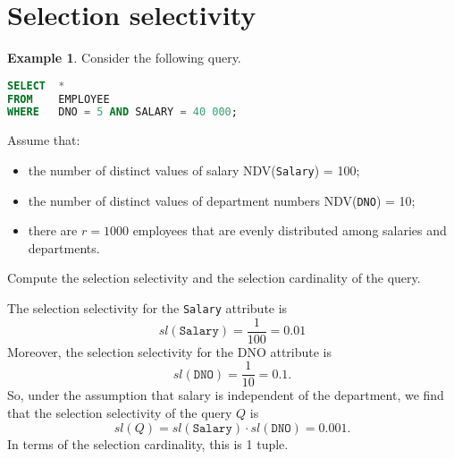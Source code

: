 \documentclass[a4paper, openany]{memoir}
\theoremstyle{definition}
\newtheorem{example}[subsection]{Example}
\begin{document}
\section{Selection selectivity}
\begin{example}
    Consider the following query.
\begin{lstlisting}[language=SQL]
SELECT  * 
FROM    EMPLOYEE
WHERE   DNO = 5 AND SALARY = 40 000;
\end{lstlisting}
    Assume that:
    \begin{itemize}
        \item the number of distinct values of salary NDV(\texttt{Salary}) = 100;
        \item the number of distinct values of department numbers NDV(\texttt{DNO}) = 10;
        \item there are $r = 1000$ employees that are evenly distributed among salaries and departments.
    \end{itemize}
    Compute the selection selectivity and the selection cardinality of the query.
\end{example}
\begin{answer}
    The selection selectivity for the \texttt{Salary} attribute is
    \[\textit{sl}(\texttt{Salary}) = \frac{1}{100} = 0.01\]
    Moreover, the selection selectivity for the DNO attribute is
    \[\textit{sl}(\texttt{DNO}) = \frac{1}{10} = 0.1.\]
    So, under the assumption that salary is independent of the department, we find that the selection selectivity of the query $Q$ is
    \[\textit{sl}(Q) = \textit{sl}(\texttt{Salary}) \cdot \textit{sl}(\texttt{DNO}) = 0.001.\]
    In terms of the selection cardinality, this is 1 tuple.
\end{answer}
\end{document}
